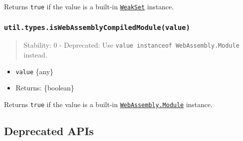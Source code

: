 Returns \texttt{true} if the value is a built-in
\href{https://developer.mozilla.org/en-US/docs/Web/JavaScript/Reference/Global_Objects/WeakSet}{\texttt{WeakSet}}
instance.

\begin{Shaded}
\begin{Highlighting}[]
\NormalTok{(} \NormalTok{())}\OperatorTok{;}  
\end{Highlighting}
\end{Shaded}

\subsubsection{\texorpdfstring{\texttt{util.types.isWebAssemblyCompiledModule(value)}}{util.types.isWebAssemblyCompiledModule(value)}}\label{util.types.iswebassemblycompiledmodulevalue}

\begin{quote}
Stability: 0 - Deprecated: Use
\texttt{value\ instanceof\ WebAssembly.Module} instead.
\end{quote}

\begin{itemize}
\tightlist
\item
  \texttt{value} \{any\}
\item
  Returns: \{boolean\}
\end{itemize}

Returns \texttt{true} if the value is a built-in
\href{https://developer.mozilla.org/en-US/docs/Web/JavaScript/Reference/Global_Objects/WebAssembly/Module}{\texttt{WebAssembly.Module}}
instance.

\begin{Shaded}
\begin{Highlighting}[]
\OperatorTok{=} \OperatorTok{;}
\OperatorTok{;}  
\end{Highlighting}
\end{Shaded}

\subsection{Deprecated APIs}\label{deprecated-apis}

